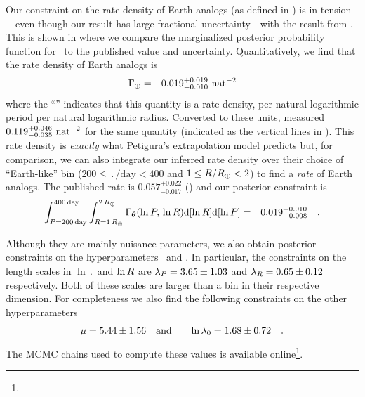Our constraint on the rate density of Earth analogs (as defined in
) is in tension---even though our result has large fractional
uncertainty---with the result from \citet{Petigura:2013}.
This is shown in  where we compare the marginalized posterior
probability function for \gammaearth\ to the published value and uncertainty.
Quantitatively, we find that the rate density of Earth analogs is
\begin{eqnarray}\eqlabel{ge-result}
\gammaearth &=& 0.019^{+0.019}_{-0.010}~\densityunit
\end{eqnarray}
where the ``\densityunit'' indicates that this quantity is a rate density, per
natural logarithmic period per natural logarithmic radius.
Converted to these units, \citet{Petigura:2013} measured
$0.119_{-0.035}^{+0.046}~{\mathrm{nat}^{-2}}$ for the same quantity (indicated as the
vertical lines in ).
This rate density is \emph{exactly} what Petigura's extrapolation model
predicts but, for comparison, we can also integrate our inferred rate density
over their choice of ``Earth-like'' bin ($200 \le \period/\mathrm{day} < 400$
and $1 \le R/R_\oplus < 2$) to find a \emph{rate} of
Earth analogs.
The published rate is $0.057_{-0.017}^{+0.022}$ (\citealt{Petigura:2013}) and our
posterior constraint is
\begin{eqnarray}
\int_{P=200\,\mathrm{day}}^{400\,\mathrm{day}}
\int_{R=1\,R_\oplus}^{2\,R_\oplus}
\Gamma_{\boldsymbol{{\theta}}} (\ln P,\,\ln R)
\mathrm{d}[\ln R]
\mathrm{d}[\ln P]
&=&
0.019_{-0.008}^{+0.010}
\quad.
\end{eqnarray}

Although they are mainly nuisance parameters, we also obtain posterior
constraints on the hyperparameters \mean\ and \smoothpars.
In particular, the constraints on the length scales in $\ln \period$ and $\ln
R$ are ${\lambda}_{P} = 3.65 \pm 1.03$ and ${\lambda}_{R} = 0.65 \pm
0.12$ respectively.
Both of these scales are larger than a bin in their respective dimension.
For completeness we also find the following constraints on the other
hyperparameters
\begin{eqnarray}
{\ensuremath{\mu}} = 5.44 \pm 1.56 &\quad\mathrm{and}\quad&
\ln{\ensuremath{\lambda}}_0 = 1.68 \pm 0.72 \quad.
\end{eqnarray}
The MCMC chains used to compute these values is available
online\footnote{\resultsurl}.

